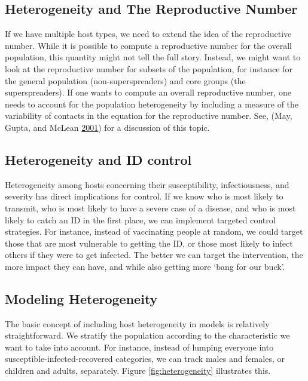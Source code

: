 \documentclass[]{article}
\theoremstyle{definition}
\theoremstyle{definition}
\theoremstyle{definition}
\theoremstyle{remark}
\begin{document}
\subsection{Heterogeneity and The Reproductive
Number}\label{heterogeneity-and-the-reproductive-number}

If we have multiple host types, we need to extend the idea of the
reproductive number. While it is possible to compute a reproductive
number for the overall population, this quantity might not tell the full
story. Instead, we might want to look at the reproductive number for
subsets of the population, for instance for the general population
(non-superspreaders) and core groups (the superspreaders). If one wants
to compute an overall reproductive number, one needs to account for the
population heterogeneity by including a measure of the variability of
contacts in the equation for the reproductive number. See, (May, Gupta,
and McLean \protect\hyperlink{ref-may01}{2001}) for a discussion of this
topic.

\subsection{Heterogeneity and ID
control}\label{heterogeneity-and-id-control}

Heterogeneity among hosts concerning their susceptibility,
infectiousness, and severity has direct implications for control. If we
know who is most likely to transmit, who is most likely to have a severe
case of a disease, and who is most likely to catch an ID in the first
place, we can implement targeted control strategies. For instance,
instead of vaccinating people at random, we could target those that are
most vulnerable to getting the ID, or those most likely to infect others
if they were to get infected. The better we can target the intervention,
the more impact they can have, and while also getting more `bang for our
buck'.

\subsection{Modeling Heterogeneity}\label{modeling-heterogeneity}

The basic concept of including host heterogeneity in models is
relatively straightforward. We stratify the population according to the
characteristic we want to take into account. For instance, instead of
lumping everyone into susceptible-infected-recovered categories, we can
track males and females, or children and adults, separately. Figure
\ref{fig:heterogeneity} illustrates this.
\end{document}
